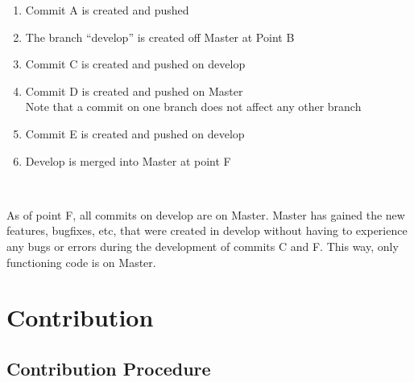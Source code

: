 \documentclass{article}
\begin{document}
\begin{enumerate}
	\item Commit A is created and pushed
	\item The branch ``develop'' is created off Master at Point B
	\item Commit C is created and pushed on develop
	\item Commit D is created and pushed on Master
		\\Note that a commit on one branch does not affect any other branch
	\item Commit E is created and pushed on develop
	\item Develop is merged into Master at point F
\end{enumerate}

\

As of point F, all commits on develop are on Master. Master has gained the new features, bugfixes, etc, that were created in develop without having to experience any bugs or errors during the development of commits C and F. This way, only functioning code is on Master.

\pagebreak

\section{Contribution}

\subsection{Contribution Procedure}
\end{document}
